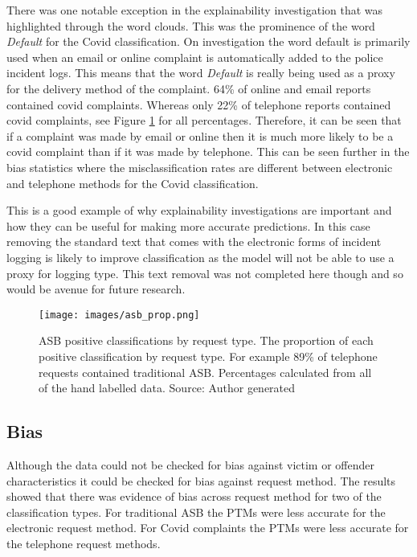 There was one notable exception in the explainability investigation that was highlighted through the word clouds. This was the prominence of the word \emph{Default} for the Covid classification. On investigation the word default is primarily used when an email or online complaint is automatically added to the police incident logs. This means that the word \emph{Default} is really being used as a proxy for the delivery method of the complaint.  64\% of online and email reports contained covid complaints.  Whereas only 22\% of  telephone reports contained covid complaints, see Figure \ref{fig: asb_prop} for all percentages. Therefore, it can be seen that if a complaint was made by email or online then it is much more likely to be a covid complaint than if it was made by telephone.   This can be seen further in the bias statistics where the misclassification rates are different between electronic and telephone methods for the Covid classification. 

This is a good example of why explainability investigations are important and how they can be useful for making more accurate predictions. In this case removing the standard text that comes with the electronic forms of incident logging is likely to improve classification as the model will not be able to use a proxy for logging type. This text removal was not completed here though and so would be avenue for future research.

 \begin{figure}[h]
    \texttt{[image: images/asb\_prop.png]}
    \caption[Proportion of ASB classification by request type.]{{ASB positive classifications by request type.} The proportion of each positive classification by request type. For example 89\% of telephone requests contained traditional ASB. Percentages calculated from all of the hand labelled data. Source: Author generated}
    \label{fig: asb_prop}
\end{figure}

\subsection{Bias}Although the data could not be checked for bias against victim or offender characteristics it could be checked for bias against request method. The results showed that there was evidence of bias across request method for two of the classification types. For traditional ASB the PTMs were less accurate for the electronic request method. For Covid complaints the PTMs were less accurate for the telephone request methods.

